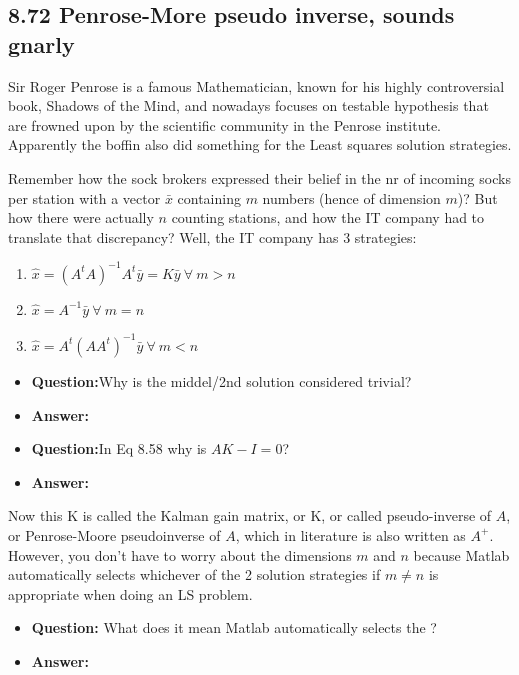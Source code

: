 \subsection{8.72 Penrose-More pseudo inverse, sounds gnarly}
Sir Roger Penrose is a famous Mathematician, known for his highly controversial book, Shadows of the Mind, and nowadays focuses on testable hypothesis that are frowned upon by the scientific community in the Penrose institute. Apparently the boffin also did something for the Least squares solution strategies.

Remember how the sock brokers expressed their belief in the nr of incoming socks per station with a vector $\bar{x}$ containing $m$ numbers (hence of dimension $m$)? But how there were actually $n$ counting stations, and how the IT company had to translate that discrepancy? Well, the IT company has 3 strategies:
\begin{enumerate}
    \item $\hat{x}={(A^tA)}^{-1}A^t\bar{y}=K\bar{y} \  \forall \ m>n$
    \item $\hat{x}={A}^{-1}\bar{y} \  \forall \ m=n$
    \item $\hat{x}=A^t{(AA^t)}^{-1}\bar{y} \  \forall \ m<n$
\end{enumerate}
\begin{itemize}
    \item \textbf{Question:}Why is the middel/2nd solution considered trivial?
    \item \textbf{Answer:}
\end{itemize}

\begin{itemize}
    \item \textbf{Question:}In Eq 8.58 why is $AK-I=0$?
    \item \textbf{Answer:}
\end{itemize}

Now this K is called the Kalman gain matrix, or K, or called pseudo-inverse of $A$, or Penrose-Moore pseudoinverse of $A$, which in literature is also written as $A^+$.
However, you don't have to worry about the dimensions $m$ and $n$ because Matlab automatically selects whichever of the 2 solution strategies if $m\neq n$ is appropriate when doing an LS problem.
\begin{itemize}
    \item \textbf{Question:} What does it mean Matlab automatically selects the ?
    \item \textbf{Answer:}
\end{itemize}



